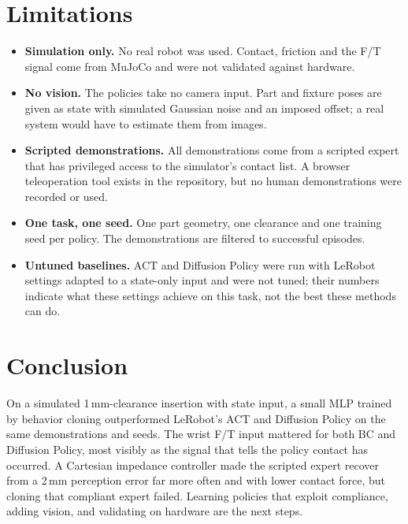 \documentclass[conference]{IEEEtran}
\begin{document}
\section{Limitations}
\begin{itemize}
\item \textbf{Simulation only.} No real robot was used. Contact, friction and the F/T signal come from MuJoCo and were not validated against hardware.
\item \textbf{No vision.} The policies take no camera input. Part and fixture poses are given as state with simulated Gaussian noise and an imposed offset; a real system would have to estimate them from images.
\item \textbf{Scripted demonstrations.} All demonstrations come from a scripted expert that has privileged access to the simulator's contact list. A browser teleoperation tool exists in the repository, but no human demonstrations were recorded or used.
\item \textbf{One task, one seed.} One part geometry, one clearance and one training seed per policy. The demonstrations are filtered to successful episodes.
\item \textbf{Untuned baselines.} ACT and Diffusion Policy were run with LeRobot settings adapted to a state-only input and were not tuned; their numbers indicate what these settings achieve on this task, not the best these methods can do.
\end{itemize}

\section{Conclusion}
On a simulated 1\,mm-clearance insertion with state input, a small MLP trained by behavior cloning outperformed LeRobot's ACT and Diffusion Policy on the same demonstrations and seeds. The wrist F/T input mattered for both BC and Diffusion Policy, most visibly as the signal that tells the policy contact has occurred. A Cartesian impedance controller made the scripted expert recover from a 2\,mm perception error far more often and with lower contact force, but cloning that compliant expert failed. Learning policies that exploit compliance, adding vision, and validating on hardware are the next steps.



\end{document}
